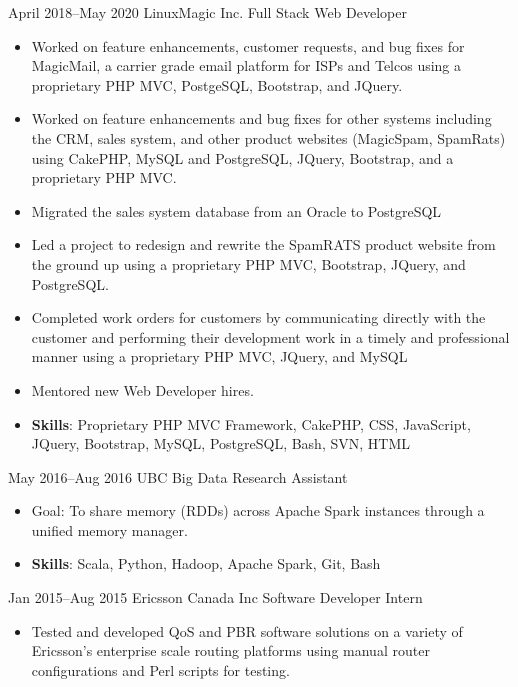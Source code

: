 \documentclass[]{friggeri-cv} %
\begin{document}
\begin{entrylistSkinny}

\entrySkinny
{April 2018--May 2020}
{LinuxMagic Inc. {\normalfont Full Stack Web Developer}}
{
\begin{itemize}
\item Worked on feature enhancements, customer requests, and bug fixes for
MagicMail, a carrier grade email platform for ISPs and Telcos using a
proprietary PHP MVC, PostgeSQL, Bootstrap, and JQuery.
\item Worked on feature enhancements and bug fixes for other systems including
the  CRM, sales system, and other product websites (MagicSpam, SpamRats) using
CakePHP, MySQL and PostgreSQL, JQuery, Bootstrap, and a proprietary PHP MVC.
\item Migrated the sales system database from an Oracle to PostgreSQL
\item Led a project to redesign and rewrite the SpamRATS product website from
the ground up using a proprietary PHP MVC, Bootstrap, JQuery, and
PostgreSQL.
\item Completed work orders for customers by communicating directly with the
customer and performing their development work in a timely and professional
manner using a proprietary PHP MVC, JQuery, and MySQL
\item Mentored new Web Developer hires.
\item {\bf Skills}: Proprietary PHP MVC Framework, CakePHP, CSS, JavaScript,
 JQuery, Bootstrap, MySQL, PostgreSQL, Bash, SVN, HTML\\
\end{itemize}
}
\entrySkinny
{May 2016--Aug 2016}
{UBC {\normalfont Big Data Research Assistant}}
{
\begin{itemize}
  \item Goal: To share memory (RDDs) across Apache Spark instances through a
  unified memory manager.
  \item {\bf Skills}: Scala, Python, Hadoop, Apache Spark, Git, Bash\\
\end{itemize}
}
\entrySkinny
{Jan 2015--Aug 2015}
{Ericsson Canada Inc {\normalfont Software Developer Intern}}
{
\begin{itemize}
  \item Tested and developed QoS and PBR software solutions on a variety of
    Ericsson's enterprise scale routing platforms using manual router
    configurations and Perl scripts for testing.

\end{itemize}}
\end{entrylistSkinny}
\end{document}
